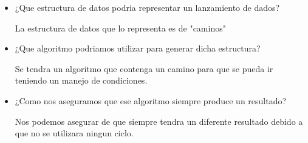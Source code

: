 \documentclass{article}
\begin{document}
\begin{itemize}


   \item ¿Que estructura de datos podria representar un lanzamiento de dados? \par


   La estructura de datos que lo representa es de "caminos"


   \item ¿Que algoritmo podriamos utilizar para generar dicha estructura? \par


   Se tendra un algoritmo que contenga un camino para que se pueda ir teniendo un manejo de condiciones.


   \item  ¿Como nos aseguramos que ese algoritmo siempre produce un resultado? \par


   Nos podemos asegurar de que siempre tendra un diferente resultado debido a que no se utilizara ningun ciclo.


\end{itemize}
\end{document}
